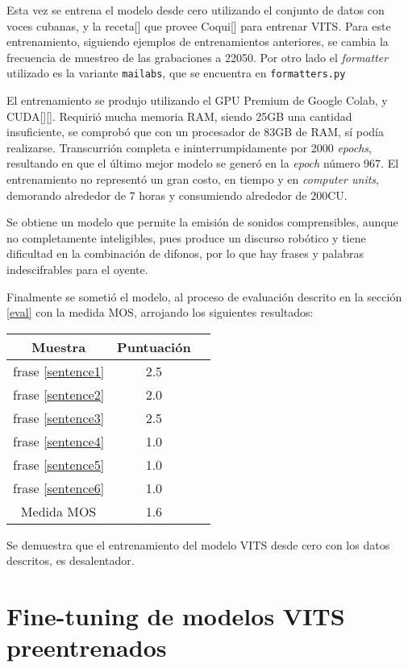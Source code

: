 Esta vez se entrena el modelo desde cero utilizando el conjunto de datos con voces cubanas, y la receta[\cite{train-vits}] que provee Coqui[\cite{coqui-doc}] para entrenar VITS. Para este entrenamiento, siguiendo ejemplos de entrenamientos anteriores, se cambia la frecuencia de muestreo de las grabaciones a 22050. Por otro lado el \textit{formatter} utilizado es la variante \texttt{mailabs}, que se encuentra en \texttt{formatters.py}

El entrenamiento se produjo utilizando el GPU Premium de Google Colab, y CUDA[\cite{cuda}][\cite{cuda1}]. Requirió mucha memoria RAM, siendo 25GB una cantidad insuficiente, se comprobó que con un procesador de 83GB de RAM, sí podía realizarse. Transcurrión completa e ininterrumpidamente por 2000 \textit{epochs}, resultando en que el último mejor modelo se generó en la \textit{epoch} número 967. El entrenamiento no representó un gran costo, en tiempo y en \textit{computer units}, demorando alrededor de 7 horas y consumiendo alrededor de 200CU.

Se obtiene un modelo que permite la emisión de sonidos comprensibles, aunque no completamente inteligibles, pues produce un discurso robótico y tiene dificultad en la combinación de difonos, por lo que hay frases y palabras indescifrables para el oyente.

Finalmente se sometió el modelo, al proceso de evaluación descrito en la sección \ref{eval} con la medida MOS, arrojando los siguientes resultados:

\begin{center} \begin{tabular}{ |c|c|c| } 
\hline 
Muestra & Puntuación \\
\hline
frase \ref{sentence1} & 2.5 \\
frase \ref{sentence2} & 2.0 \\
frase \ref{sentence3} & 2.5 \\
frase \ref{sentence4} & 1.0 \\
frase \ref{sentence5} & 1.0 \\
frase \ref{sentence6} & 1.0 \\
\hline
Medida MOS & 1.6\\
 \hline 
\end{tabular} 
\end{center}

Se demuestra que el entrenamiento del modelo VITS desde cero con los datos descritos, es desalentador.


\section{Fine-tuning de modelos VITS preentrenados} \label{vits_it_en}

